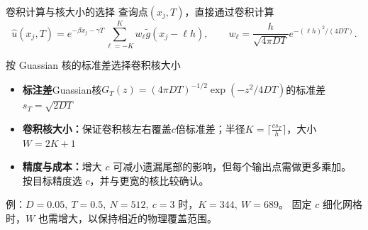 \documentclass[UTF8,aspectratio=169,10pt]{ctexbeamer}
\begin{document}
\begin{frame}{卷积计算与核大小的选择}
\small
查询点$(x_j,T)$，直接通过卷积计算
\[
\widehat{u}(x_j,T)=e^{-\beta x_j-\gamma T}\sum_{\ell=-K}^{K}w_\ell\widetilde g(x_j-\ell h),
\qquad
w_\ell=\frac{h}{\sqrt{4\pi DT}}e^{-(\ell h)^2/(4DT)}.
\]
\begin{block}{按 Guassian 核的标准差选择卷积核大小}
\begin{itemize}
\item \textbf{标注差}Guassian核$G_T(z)=(4\pi DT)^{-1/2}\exp(-z^2/4DT)$的标准差$s_T=\sqrt{2DT}$
\item \textbf{卷积核大小：}保证卷积核左右覆盖$c$倍标准差；半径$K=\lceil\frac{cs_T}{h}\rceil$，大小$W=2K+1$
\item \textbf{精度与成本：}增大 $c$ 可减小遗漏尾部的影响，但每个输出点需做更多乘加。
      按目标精度选 $c$，并与更宽的核比较确认。
\end{itemize}
\end{block}

\medskip
{\footnotesize 例：$D=0.05,\ T=0.5,\ N=512,\ c=3$ 时，$K=344,\ W=689$。
固定 $c$ 细化网格时，$W$ 也需增大，以保持相近的物理覆盖范围。}
\end{frame}
\end{document}
